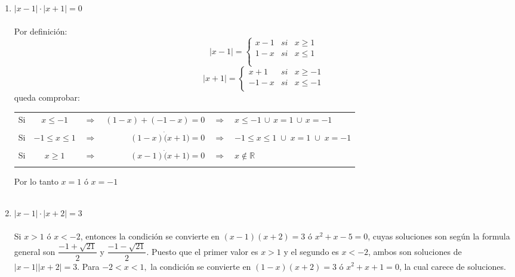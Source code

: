 \begin{enumerate}[\bfseries 1.]
\begin{enumerate}[\bfseries (i)]
\item $|x-1|\cdot |x+1|=0$\\\\
Por definición:
\begin{equation}
|x-1| = \left\lbrace
\begin{array}{rcr}
  x-1& si & x\geq 1\\
 1-x& si & x \leq 1\\\\
\end{array}
\right.
\end{equation}
\begin{equation}
|x+1| = \left\lbrace
\begin{array}{rcr}
  x+1& si & x\geq -1\\
 -1-x& si & x \leq -1\\
\end{array}
\right.
\end{equation}
queda comprobar:\\
\begin{center}
\begin{tabular}{c c c r c l}
Si&$x\leq -1$&$\Rightarrow$&$(1-x)+(-1-x)=0$&$\Rightarrow$&$x\leq-1 \, \cup \, x = 1 \, \cup \, x=-1 $\\\\
Si&$-1\leq x \leq 1$&$\Rightarrow$&$(1-x)\dot (x+1)=0$&$\Rightarrow$&$-1\leq x \leq 1 \; \cup \; x=1 \; \cup \; x=-1$\\\\
Si&$x\geq 1$&$\Rightarrow$&$(x-1)\dot (x+1)=0$&$\Rightarrow $&$x \notin \mathbb{R}$\\\\
\end{tabular}
\end{center}
Por lo tanto $x=1$ \; ó \; $x=-1$\\\\

\item $|x-1|\cdot |x+2|= 3$\\\\
Si $x>1$ ó $x<-2$, entonces la condición se convierte en $(x-1)(x+2)=3$ ó $x^2+x-5=0$, cuyas soluciones son según la formula general son $\dfrac{-1+\sqrt{21}}{2}$ y $\dfrac{-1-\sqrt{21}}{2}$. Puesto que el primer valor es $x>1$ y el segundo es $x<-2$, ambos son soluciones de $|x-1||x+2|=3.$ Para $-2<x<1,$ la condición se convierte en $(1-x)(x+2)=3$ ó $x^2+x+1=0$, la cual carece de soluciones.\\\\
\end{enumerate}


\end{enumerate}

